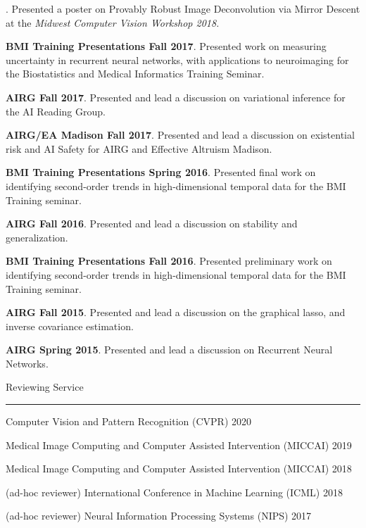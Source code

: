 \documentclass[]{article}
\begin{document}
. Presented a poster on Provably Robust Image Deconvolution via Mirror Descent at the \textit{Midwest Computer Vision Workshop 2018.}

\noindent \textbf{BMI Training Presentations Fall 2017}. Presented work on measuring uncertainty in recurrent neural networks, with applications to neuroimaging for the Biostatistics and Medical Informatics Training Seminar.

\noindent \textbf{AIRG Fall 2017}. Presented and lead a discussion on variational inference for the AI Reading Group.

\noindent \textbf{AIRG/EA Madison Fall 2017}. Presented and lead a discussion on existential risk and AI Safety for AIRG and Effective Altruism Madison.

\noindent \textbf{BMI Training Presentations Spring 2016}. Presented final work on identifying second-order trends in high-dimensional temporal data for the BMI Training seminar.

\noindent \textbf{AIRG Fall 2016}. Presented and lead a discussion on stability and generalization.

\noindent \textbf{BMI Training Presentations Fall 2016}. Presented preliminary work on identifying second-order trends in high-dimensional temporal data for the BMI Training seminar.

\noindent \textbf{AIRG Fall 2015}. Presented and lead a discussion on the graphical lasso, and inverse covariance estimation.

\noindent \textbf{AIRG Spring 2015}. Presented and lead a discussion on Recurrent Neural Networks.

\clearpage

\vspace{20pt}
{\LARGE Reviewing Service}
\vspace{3pt}
\hrule
\vspace{10pt}

\noindent Computer Vision and Pattern Recognition (CVPR) \hfill 2020

\noindent Medical Image Computing and Computer Assisted Intervention (MICCAI) \hfill 2019

\noindent Medical Image Computing and Computer Assisted Intervention (MICCAI) \hfill 2018

\noindent (ad-hoc reviewer) International Conference in Machine Learning (ICML) \hfill 2018

\noindent (ad-hoc reviewer) Neural Information Processing Systems (NIPS) \hfill 2017
\end{document}
